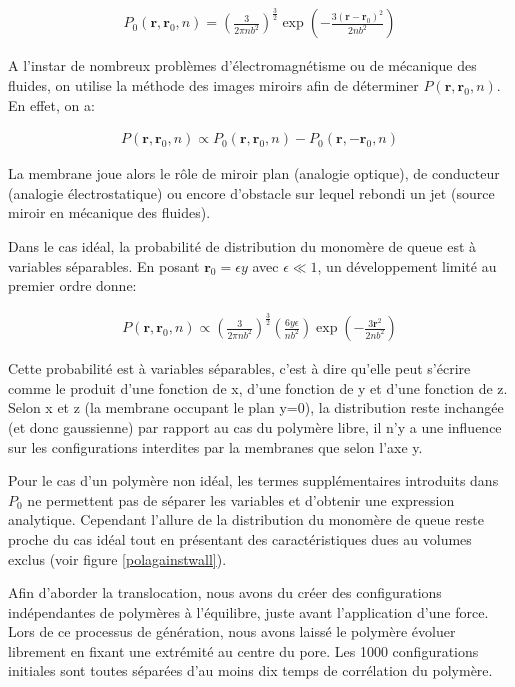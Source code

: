 \documentclass[a4paper,11pt]{article}
\begin{document}
\begin{eqnarray}
P_0(\textbf{r},\textbf{r}_0,n)=\left(\frac{3}{2\pi n b^2}\right)^\frac{3}{2}\exp\left(-\frac{3(\textbf{r}-\textbf{r}_0)^2}{2 n b^2}\right)
\end{eqnarray}

A l'instar de nombreux problèmes d'électromagnétisme ou de mécanique des fluides, on utilise la méthode des images miroirs afin de déterminer $P(\textbf{r},\textbf{r}_0,n)$. En effet, on a:

\begin{eqnarray}
P(\textbf{r},\textbf{r}_0,n) \propto P_0(\textbf{r},\textbf{r}_0,n)-P_0(\textbf{r},-\textbf{r}_0,n)
\end{eqnarray}

La membrane joue alors le rôle de miroir plan (analogie optique), de conducteur (analogie électrostatique) ou encore d'obstacle sur lequel rebondi un jet (source miroir en mécanique des fluides).

Dans le cas idéal, la probabilité de distribution du monomère de queue est à variables séparables. En posant $\textbf{r}_0= \epsilon y$ avec $\epsilon \ll 1$, un développement limité au premier ordre donne:

\begin{eqnarray}
P(\textbf{r},\textbf{r}_0,n) \propto \left(\frac{3}{2\pi n b^2}\right)^\frac{3}{2} \left(\frac{6 y \epsilon}{n b^2}\right)\exp\left(-\frac{3\textbf{r}^2}{2 n b^2}\right)
\end{eqnarray}

Cette probabilité est à variables séparables, c'est à dire qu'elle peut s'écrire comme le produit d'une fonction de x, d'une fonction de y  et d'une fonction de z. Selon x et z (la membrane occupant le plan y=0), la distribution reste inchangée (et donc gaussienne) par rapport au cas du polymère libre, il n'y a une influence sur les configurations interdites par la membranes que selon l'axe y.

Pour le cas d'un polymère non idéal, les termes supplémentaires introduits dans $P_0$ ne permettent pas de séparer les variables et d'obtenir une expression analytique. Cependant l'allure de la distribution du monomère de queue reste proche du cas idéal tout en présentant des caractéristiques dues au volumes exclus (voir figure \ref{polagainstwall}).

Afin d'aborder la translocation, nous avons du créer des configurations indépendantes de polymères à l'équilibre, juste avant l'application d'une force. Lors de ce processus de génération, nous avons laissé le polymère évoluer librement en fixant une extrémité au centre du pore. Les 1000 configurations initiales sont toutes séparées d'au moins dix temps de corrélation du polymère.
\end{document}
